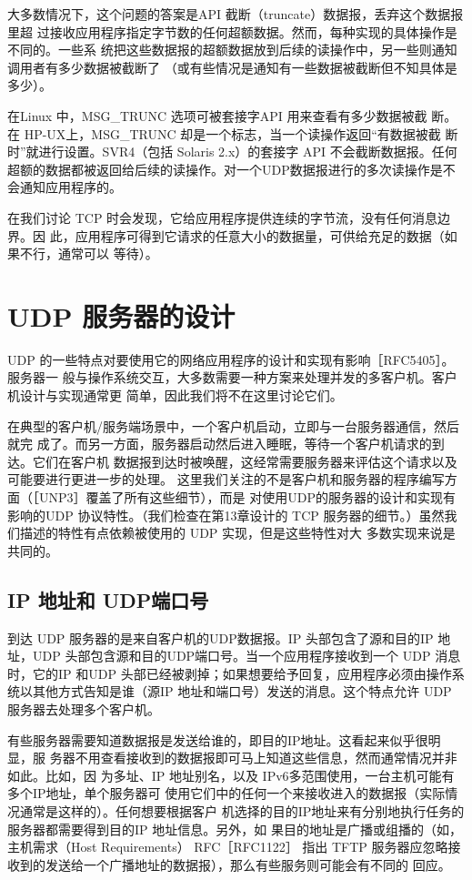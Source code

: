 大多数情况下，这个问题的答案是API 截断（truncate）数据报，丢弃这个数据报里超
过接收应用程序指定字节数的任何超额数据。然而，每种实现的具体操作是不同的。一些系
统把这些数据报的超额数据放到后续的读操作中，另一些则通知调用者有多少数据被截断了
（或有些情况是通知有一些数据被截断但不知具体是多少）。

\begin{tcolorbox}    
    在Linux 中，MSG\_TRUNC 选项可被套接字API 用来查看有多少数据被截
    断。在 HP-UX上，MSG\_TRUNC 却是一个标志，当一个读操作返回“有数据被截
    断时”就进行设置。SVR4（包括 Solaris 2.x）的套接字 API 不会截断数据报。任何
    超额的数据都被返回给后续的读操作。对一个UDP数据报进行的多次读操作是不
    会通知应用程序的。
\end{tcolorbox}

在我们讨论 TCP 时会发现，它给应用程序提供连续的字节流，没有任何消息边界。因
此，应用程序可得到它请求的任意大小的数据量，可供给充足的数据（如果不行，通常可以
等待）。

\section{UDP 服务器的设计}
UDP 的一些特点对要使用它的网络应用程序的设计和实现有影响［RFC5405］。服务器一
般与操作系统交互，大多数需要一种方案来处理并发的多客户机。客户机设计与实现通常更
简单，因此我们将不在这里讨论它们。

在典型的客户机/服务端场景中，一个客户机启动，立即与一台服务器通信，然后就完
成了。而另一方面，服务器启动然后进入睡眠，等待一个客户机请求的到达。它们在客户机
数据报到达时被唤醒，这经常需要服务器来评估这个请求以及可能要进行更进一步的处理。
这里我们关注的不是客户机和服务器的程序编写方面（［UNP3］覆盖了所有这些细节），而是
对使用UDP的服务器的设计和实现有影响的UDP 协议特性。（我们检查在第13章设计的
TCP 服务器的细节。）虽然我们描述的特性有点依赖被使用的 UDP 实现，但是这些特性对大
多数实现来说是共同的。

\subsection{IP 地址和 UDP端口号}
到达 UDP 服务器的是来自客户机的UDP数据报。IP 头部包含了源和目的IP 地址，UDP
头部包含源和目的UDP端口号。当一个应用程序接收到一个 UDP 消息时，它的IP 和UDP
头部已经被剥掉；如果想要给予回复，应用程序必须由操作系统以其他方式告知是谁（源IP
地址和端口号）发送的消息。这个特点允许 UDP 服务器去处理多个客户机。

有些服务器需要知道数据报是发送给谁的，即目的IP地址。这看起来似乎很明显，服
务器不用查看接收到的数据报即可马上知道这些信息，然而通常情况并非如此。比如，因
为多址、IP 地址别名，以及 IPv6多范围使用，一台主机可能有多个IP地址，单个服务器可
使用它们中的任何一个来接收进入的数据报（实际情况通常是这样的）。任何想要根据客户
机选择的目的IP地址来有分别地执行任务的服务器都需要得到目的IP 地址信息。另外，如
果目的地址是广播或组播的（如，主机需求（Host Requirements） RFC［RFC1122］ 指出 TFTP
服务器应忽略接收到的发送给一个广播地址的数据报），那么有些服务则可能会有不同的
回应。

